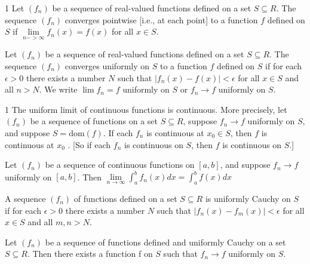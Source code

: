 

\begin{defn}{1}
	Let $(f_n)$ be a sequence of real-valued functions defined on a set $S \subseteq R$. The sequence $(f_n)$ converges pointwise [i.e., at each point] to a	function $f$ defined on $S$ if $\lim\limits_{n->\infty} f_n(x) = f(x)$	for all $x \in S$.
\end{defn}

\begin{defn}{1}
	Let $(f_n)$ be a sequence of real-valued functions defined on a set
	$S \subseteq R$. The sequence $(f_n)$ converges uniformly on $S$ to a function $f$ defined on $S$ if for each $\epsilon > 0$ there exists a number $N$ such that $|f_n(x) - f(x)| < \epsilon$ for all $x \in S$ and all $n > N$. We write $\lim f_n = f$ uniformly on $S$ or $f_n \rightarrow f$ uniformly on $S$.
\end{defn}

\begin{theo}{1}
	The uniform limit of continuous functions is continuous. More precisely, let $(f_n)$ be a sequence of functions on a set $S \subseteq R$, suppose $f_n \rightarrow f$ uniformly on $S$, and suppose $S = \textrm{dom}(f)$. If each $f_n$ is
	continuous at $x_0 \in S$, then $f$ is continuous at $x_0$ . [So if each $f_n$ is
	continuous on $S$, then $f$ is continuous on $S$.]
\end{theo}


\begin{theo}{1}
	Let $(f_n)$ be a sequence of continuous functions on $[a, b]$, and suppose $f_n \rightarrow f$ uniformly on $[a, b]$. Then $\lim\limits_{n\rightarrow \infty} \int_{a}^{b}f_n(x) dx = \int_{a}^{b} f(x) dx$
\end{theo}

\begin{defn}{1}
	A sequence $(f_n)$ of functions defined on a set $S \subseteq R$ is uniformly Cauchy on $S$ if for each $\epsilon > 0$ there exists a number $N$ such that $|f_n(x) - f_m(x)| < \epsilon$ for all $x \in S$ and all $m, n > N$.
\end{defn}

\begin{theo}{1}
	Let $(f_n)$ be a sequence of functions defined and uniformly Cauchy on a set $S \subseteq R$. Then there exists a function f on $S$ such that $f_n \rightarrow f$ uniformly on $S$.
\end{theo}

